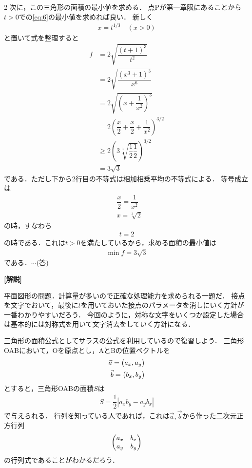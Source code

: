 \documentclass[../../main.tex]{subfiles}
\begin{document}
\begin{multicols}{2}
  次に，この三角形の面積の最小値を求める．
  点Pが第一章限にあることから$t>0$での\cref{eq:6}の最小値を求めれば良い．
  新しく
  \begin{align}
    x = t^{1/3} \quad (x>0)
  \end{align}
  と置いて式を整理すると
  \begin{align}
    f
    & = 2\sqrt{\dfrac{(t+1)^3}{t^2}}                                 \\
    & = 2\sqrt{\dfrac{(x^3+1)^3}{x^6}}                               \\
    & = 2\sqrt{\left(x + \dfrac{1}{x^2}\right)^3}                    \\
    & = 2\left(\dfrac{x}{2}+\dfrac{x}{2} + \dfrac{1}{x^2}\right)^{3/2} \\
    & \ge 2 \left(3\sqrt[3]{\dfrac{1}{2}\dfrac{1}{2}}\right)^{3/2}    \\
    & = 3\sqrt{3}
  \end{align}
  である．ただし下から2行目の不等式は相加相乗平均の不等式による．
  等号成立は
  \begin{align}
    & \dfrac{x}{2} =  \dfrac{1}{x^2} \\
    & x =\sqrt[3]{2}
  \end{align}
  の時，すなわち
  \begin{align}
    t = 2
  \end{align}
  の時である．これは$t>0$を満たしているから，求める面積の最小値は
  \begin{align}
    \min f = 3\sqrt{3}
  \end{align}
  である．$\cdots$(答)

  {\bf [解説]}

  平面図形の問題．計算量が多いので正確な処理能力を求められる一題だ．
  接点を文字でおいて，最後に$t$を用いておいた接点のパラメータを消しにいく方針が一番わかりやすいだろう．
  今回のように，対称な文字をいくつか設定した場合は基本的には対称式を用いて文字消去をしていく方針になる．

  三角形の面積公式としてサラスの公式を利用しているので復習しよう．
  三角形OABにおいて，Oを原点とし，AとBの位置ベクトルを
  \begin{align}
    \vec{a} = \mqty(a_x,a_y) \\
    \vec{b} = \mqty(b_x,b_y)
  \end{align}
  とすると，三角形OABの面積$S$は
  \begin{align}
    S = \dfrac{1}{2}\left|a_xb_y-a_yb_x\right|
  \end{align}
  で与えられる．
  行列を知っている人であれば，これは$\vec{a},\vec{b}$から作った二次元正方行列
  \begin{align}
    \mqty(a_x & b_x \\ a_y & b_y)
  \end{align}
  の行列式であることがわかるだろう．


\end{multicols}
\end{document}
